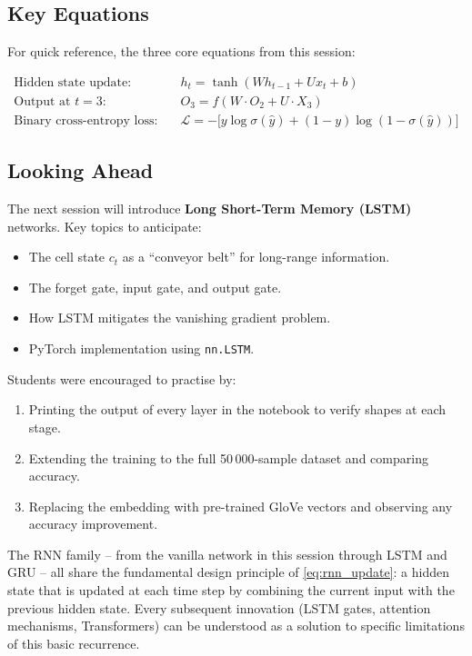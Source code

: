 \documentclass[12pt,a4paper]{article}
\newcommand{\tanh}{\operatorname{tanh}}
\begin{document}
\subsection{Key Equations}
\label{subsec:key_equations}

For quick reference, the three core equations from this session:

\begin{align}
  \text{Hidden state update:} &\quad
    h_t = \tanh(W h_{t-1} + U x_t + b)
    \label{eq:hidden_summary} \\
  \text{Output at } t=3: &\quad
    O_3 = f(W \cdot O_2 + U \cdot X_3)
    \label{eq:o3_summary} \\
  \text{Binary cross-entropy loss:} &\quad
    \mathcal{L} = -\bigl[y \log \sigma(\hat{y})
                       + (1-y)\log(1-\sigma(\hat{y}))\bigr]
    \label{eq:bce_summary}
\end{align}

\subsection{Looking Ahead}
\label{subsec:ahead}

The next session will introduce \textbf{Long Short-Term Memory (LSTM)}
networks.  Key topics to anticipate:

\begin{itemize}[noitemsep]
  \item The cell state $c_t$ as a ``conveyor belt'' for long-range information.
  \item The forget gate, input gate, and output gate.
  \item How LSTM mitigates the vanishing gradient problem.
  \item PyTorch implementation using \texttt{nn.LSTM}.
\end{itemize}

Students were encouraged to practise by:
\begin{enumerate}[noitemsep,label=(\roman*)]
  \item Printing the output of every layer in the notebook to verify
        shapes at each stage.
  \item Extending the training to the full 50\,000-sample dataset and
        comparing accuracy.
  \item Replacing the embedding with pre-trained GloVe vectors and
        observing any accuracy improvement.
\end{enumerate}

\begin{keyinsight}[title=The Big Picture]
  The RNN family -- from the vanilla network in this session through
  LSTM and GRU -- all share the fundamental design principle of
  \cref{eq:rnn_update}: a hidden state that is updated at each time
  step by combining the current input with the previous hidden state.
  Every subsequent innovation (LSTM gates, attention mechanisms,
  Transformers) can be understood as a solution to specific limitations
  of this basic recurrence.
\end{keyinsight}
\end{document}
